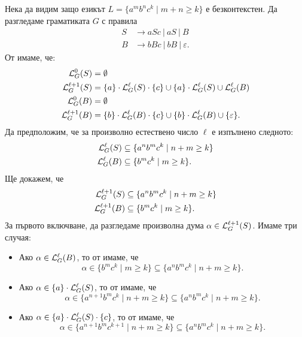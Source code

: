 \begin{extra}
  
  \begin{example}
    Нека да видим защо езикът $L = \{a^mb^nc^k\mid m+n \geq k\}$ е безконтекстен.
    Да разгледаме граматиката $G$ с правила
    \begin{align*}
      S& \rightarrow aSc\ |\ aS\ |\ B\\
      B& \rightarrow bBc\ |\  bB\ |\ \varepsilon.
    \end{align*}
    От  имаме, че:
    \begin{align*}
      \mathcal{L}^0_G(S) & = \emptyset\\
      \mathcal{L}^{\ell+1}_G(S) & = \{a\} \cdot \mathcal{L}^\ell_G(S) \cdot \{c\} \cup \{a\}\cdot \mathcal{L}^\ell_G(S) \cup \mathcal{L}^\ell_G(B)\\
      \mathcal{L}^0_G(B) & = \emptyset\\
      \mathcal{L}^{\ell+1}_G(B) & = \{b\} \cdot \mathcal{L}^\ell_G(B) \cdot \{c\} \cup \{b\} \cdot \mathcal{L}^\ell_G(B) \cup \{\varepsilon\}.
    \end{align*}
    Да предположим, че за произволно естествено число $\ell$ е изпълнено следното:
    \begin{align}
      \mathcal{L}^\ell_G(S) & \subseteq \{a^nb^mc^k \mid n+m \geq k\} \\
      \mathcal{L}^\ell_G(B)  & \subseteq \{ b^mc^k \mid m \geq k\}. 
    \end{align}
    Ще докажем, че
    \begin{align*}
      \mathcal{L}^{\ell+1}_G(S) & \subseteq \{a^nb^mc^k \mid n+m \geq k\}\\
      \mathcal{L}^{\ell+1}_G(B)  & \subseteq \{ b^mc^k \mid m \geq k\}.
    \end{align*}
    За първото включване, да разгледаме произволна дума $\alpha \in \mathcal{L}^{\ell+1}_G(S)$. Имаме три случая:
    \begin{itemize}
    \item
      Ако $\alpha \in \mathcal{L}^\ell_G(B)$, то от \IndHyp имаме, че
      \[\alpha \in \{b^mc^k \mid m \geq k\} \subseteq \{a^nb^mc^k \mid n+m \geq k\}.\]
    \item
      Ако $\alpha \in \{a\} \cdot \mathcal{L}^{\ell}_G(S)$, то от \IndHyp имаме, че
      \[\alpha \in \{a^{n+1}b^mc^k \mid n+m \geq k\} \subseteq \{a^nb^mc^k \mid n+m \geq k\}.\]
    \item
      Ако $\alpha \in \{a\} \cdot \mathcal{L}^{\ell}_G(S) \cdot \{c\}$, то от \IndHyp имаме, че
      \[\alpha \in \{a^{n+1}b^mc^{k+1} \mid n+m \geq k\} \subseteq \{a^nb^mc^k \mid n+m \geq k\}.\]

\end{itemize}
\end{example}
\end{extra}
